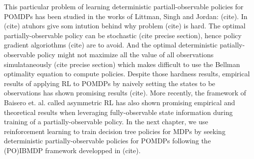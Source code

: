 This particular problem of learning deterministic partiall-observable policies for POMDPs has been studied in the works of Littman, Singh and Jordan: (cite).
In (cite) atuhors give som intution behind why problem (cite) is hard. The optimal partially-observable policy can be stochastic (cite precise section), hence policy gradient algoriothms (cite) are to avoid. And the optimal deterministic patially-observable policy might not maximize all the value of all observations simulataneously (cite precise section) which makes difficult to  use the Bellman optimality equation to compute policies.
Despite those hardness results, empirical results of applying RL to POMDPs by naively setting the states to be observations has shown promising results (cite). 
More recently, the framework of Baisero et. al. called asymmetric RL has also shown promising empirical and theoretical results when leveraging fully-observable state information during training of a partially-observable policy.
In the next chapter, we use reinforcement learning to train decision tree policies for MDPs by seeking deterministic partially-observable policies for POMDPs following the (PO)IBMDP framework developped in (cite).  
